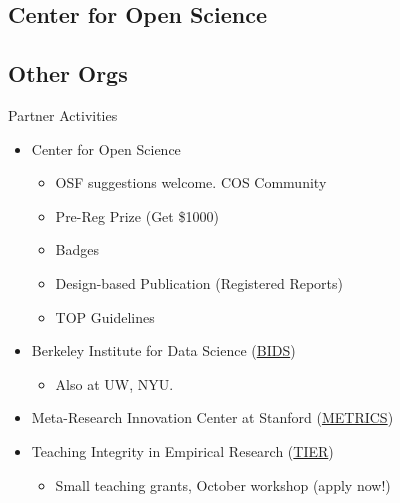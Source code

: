 \documentclass{beamer}
\begin{document}
\subsection{Center for Open Science}
\subsection{Other Orgs}
\begin{frame}{Partner Activities}
\begin{itemize}
 \item
 Center for Open Science
 \begin{itemize}
 \item OSF suggestions welcome. COS Community \href{http://centerforopenscience.org/involved_participate/}{}
 \item Pre-Reg Prize (Get \$1000) \href{http://centerforopenscience.org/prereg/}{}
 \item Badges
 \item Design-based Publication (Registered Reports)
 \item TOP Guidelines
 \end{itemize}
\item Berkeley Institute for Data Science (\href{http://bids.berkeley.edu}{BIDS})
\begin{itemize}
\item Also at UW, NYU.
\end{itemize}
\item Meta-Research Innovation Center at Stanford (\href{http://metrics.stanford.edu}{METRICS}) 
\item Teaching Integrity in Empirical Research (\href{http://www.haverford.edu/TIER/}{TIER})
\begin{itemize}
\item Small teaching grants, October workshop (apply now!)
\end{itemize}
\end{itemize}
\end{frame}
\end{document}
